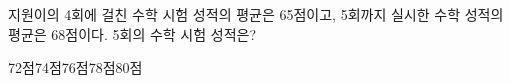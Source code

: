 지원이의 4회에 걸친 수학 시험 성적의 평균은 65점이고, 5회까지 실시한 수학 성적의 평균은 68점이다. 5회의 수학 시험 성적은?
\begin{choices32}{72점}{74점}{76점}{78점}{80점}\end{choices32}

